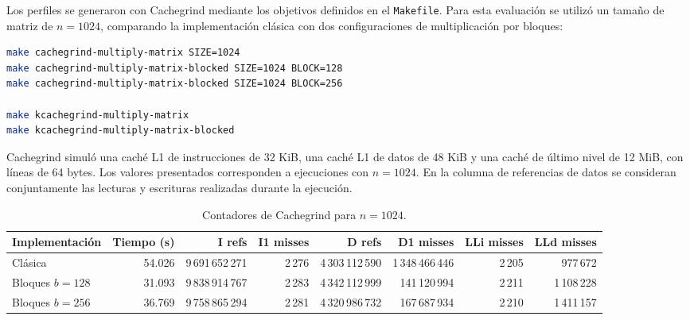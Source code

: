 \documentclass[a4paper,12pt]{article}
\begin{document}
Los perfiles se generaron con Cachegrind mediante los objetivos definidos en el
\texttt{Makefile}. Para esta evaluación se utilizó un tamaño de matriz de
\(n=1024\), comparando la implementación clásica con dos configuraciones de
multiplicación por bloques:

\begin{lstlisting}[language=bash,caption={Comandos para generar y visualizar perfiles}]
make cachegrind-multiply-matrix SIZE=1024
make cachegrind-multiply-matrix-blocked SIZE=1024 BLOCK=128
make cachegrind-multiply-matrix-blocked SIZE=1024 BLOCK=256

make kcachegrind-multiply-matrix
make kcachegrind-multiply-matrix-blocked
\end{lstlisting}

Cachegrind simuló una caché L1 de instrucciones de 32 KiB, una caché L1 de
datos de 48 KiB y una caché de último nivel de 12 MiB, con líneas de 64 bytes.
Los valores presentados corresponden a ejecuciones con \(n=1024\). En la
columna de referencias de datos se consideran conjuntamente las lecturas y
escrituras realizadas durante la ejecución.

\begin{table}[H]
    \centering
    \caption{Contadores de Cachegrind para \(n=1024\).}
    \label{tab:cachegrind}
    \scriptsize
    \begin{tabular}{l r r r r r r r}
        \toprule
        Implementación &
        Tiempo (s) &
        I refs &
        I1 misses &
        D refs &
        D1 misses &
        LLi misses &
        LLd misses \\
        \midrule

        Clásica &
        54.026 &
        9\,691\,652\,271 &
        2\,276 &
        4\,303\,112\,590 &
        1\,348\,466\,446 &
        2\,205 &
        977\,672 \\

        Bloques \(b=128\) &
        31.093 &
        9\,838\,914\,767 &
        2\,283 &
        4\,342\,112\,999 &
        141\,120\,994 &
        2\,211 &
        1\,108\,228 \\

        Bloques \(b=256\) &
        36.769 &
        9\,758\,865\,294 &
        2\,281 &
        4\,320\,986\,732 &
        167\,687\,934 &
        2\,210 &
        1\,411\,157 \\

        \bottomrule
    \end{tabular}
\end{table}
\end{document}
